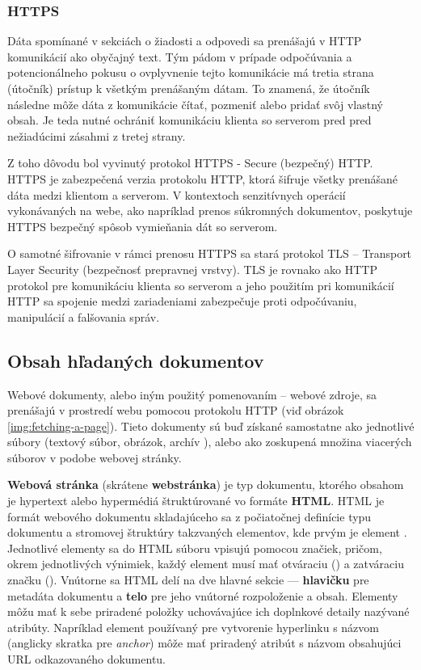 \subsubsection{HTTPS}

Dáta spomínané v sekciách o žiadosti a odpovedi sa prenášajú v HTTP komunikácií ako obyčajný text. 
Tým pádom v prípade odpočúvania a potencionálneho pokusu o ovplyvnenie tejto komunikácie má tretia strana (útočník) prístup k všetkým prenášaným dátam. 
To znamená, že útočník následne môže dáta z komunikácie čítať, pozmeniť alebo pridať svôj vlastný obsah. 
Je teda nutné ochrániť komunikáciu klienta so serverom pred pred nežiadúcimi zásahmi z tretej strany.

Z toho dôvodu bol vyvinutý protokol HTTPS - Secure (bezpečný) HTTP.
HTTPS je zabezpečená verzia protokolu HTTP, ktorá šifruje všetky prenášané dáta medzi klientom a serverom.
V kontextoch senzitívnych operácií vykonávaných na webe, ako napríklad prenos súkromných dokumentov, poskytuje HTTPS bezpečný spôsob vymieňania dát so serverom.

O samotné šifrovanie v rámci prenosu HTTPS sa stará protokol TLS -- Transport Layer Security (bezpečnosť prepravnej vrstvy).
TLS je rovnako ako HTTP protokol pre komunikáciu klienta so serverom a jeho použitím pri komunikácií HTTP sa spojenie medzi zariadeniami zabezpečuje proti odpočúvaniu, manipulácií a falšovania správ. 



\subsection{Obsah hľadaných dokumentov}
\label{obsah-hladanych-dokumentov}

Webové dokumenty, alebo iným použitý pomenovaním -- webové zdroje, sa prenášajú v prostredí webu pomocou protokolu HTTP (viď obrázok \ref{img:fetching-a-page}).
Tieto dokumenty sú buď získané samostatne ako jednotlivé súbory (textový súbor, obrázok, archív ), alebo ako zoskupená množina viacerých súborov v podobe webovej stránky.

\textbf{Webová stránka} (skrátene \textbf{webstránka}) je typ dokumentu, ktorého obsahom je hypertext alebo hypermédiá štruktúrované vo formáte \textbf{HTML}.
HTML je formát webového dokumentu skladajúceho sa z počiatočnej definície typu dokumentu a stromovej štruktúry takzvaných elementov, kde prvým je element . 
Jednotlivé elementy sa do HTML súboru vpisujú pomocou značiek, pričom, okrem jednotlivých výnimiek, 
každý element musí mať otváraciu () a zatváraciu značku ().
Vnútorne sa HTML delí na dve hlavné sekcie --- \textbf{hlavičku} pre metadáta dokumentu a \textbf{telo} pre jeho vnútorné rozpoloženie a obsah.
Elementy môžu mať k sebe priradené položky uchovávajúce ich doplnkové detaily nazývané atribúty. 
Napríklad element používaný pre vytvorenie hyperlinku s názvom  (anglicky skratka pre \textit{anchor}) 
môže mať priradený atribút s názvom  obsahujúci URL odkazovaného dokumentu.

